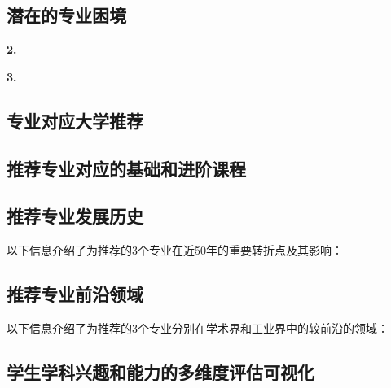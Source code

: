 \documentclass[12pt]{article}
\begin{document}
\begin{CJK*}{UTF8}{gbsn}
   \subsection*{潜在的专业困境}\textbf{2.} %




   \textbf{3.}

   \newpage
   \subsection*{专业对应大学推荐}


   \newpage
   \subsection*{推荐专业对应的基础和进阶课程}
   
   \newpage
   \subsection*{推荐专业发展历史}
   以下信息介绍了为推荐的3个专业在近50年的重要转折点及其影响：

   \newpage
   \subsection*{推荐专业前沿领域}
   以下信息介绍了为推荐的3个专业分别在学术界和工业界中的较前沿的领域：

   \newpage
   \subsection*{学生学科兴趣和能力的多维度评估可视化}
   

\end{CJK*}
\end{document}
